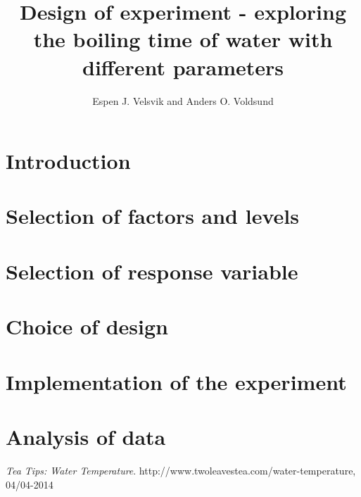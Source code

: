 \documentclass[10pt,a4paper]{article}
\begin{document}
\title{Design of experiment - exploring the boiling time of water with different parameters}
\author{Espen J. Velsvik and Anders O. Voldsund}
\maketitle

\section{Introduction}


\section{Selection of factors and levels}


\section{Selection of response variable}


\section{Choice of design}


\section{Implementation of the experiment}


\section{Analysis of data}


\newpage

\begin{thebibliography}{9}
  \emph{Tea Tips: Water Temperature}.
  http://www.twoleavestea.com/water-temperature, 04/04-2014
\end{thebibliography}
\end{document}
